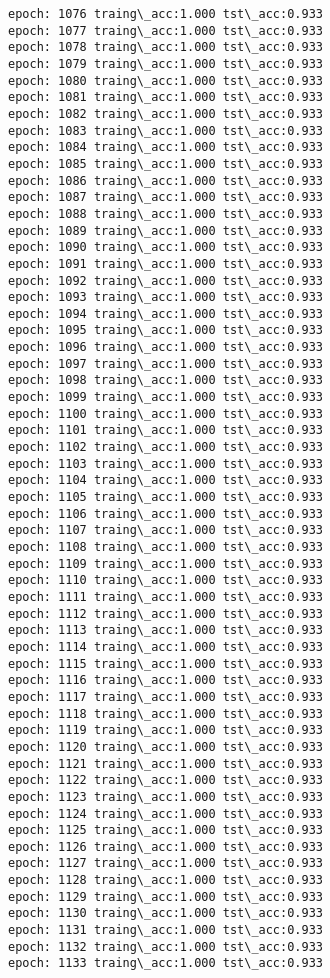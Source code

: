 \documentclass[11pt]{article}
\begin{document}
\begin{Verbatim}[commandchars=\\\{\}]
epoch: 1076 traing\_acc:1.000 tst\_acc:0.933
epoch: 1077 traing\_acc:1.000 tst\_acc:0.933
epoch: 1078 traing\_acc:1.000 tst\_acc:0.933
epoch: 1079 traing\_acc:1.000 tst\_acc:0.933
epoch: 1080 traing\_acc:1.000 tst\_acc:0.933
epoch: 1081 traing\_acc:1.000 tst\_acc:0.933
epoch: 1082 traing\_acc:1.000 tst\_acc:0.933
epoch: 1083 traing\_acc:1.000 tst\_acc:0.933
epoch: 1084 traing\_acc:1.000 tst\_acc:0.933
epoch: 1085 traing\_acc:1.000 tst\_acc:0.933
epoch: 1086 traing\_acc:1.000 tst\_acc:0.933
epoch: 1087 traing\_acc:1.000 tst\_acc:0.933
epoch: 1088 traing\_acc:1.000 tst\_acc:0.933
epoch: 1089 traing\_acc:1.000 tst\_acc:0.933
epoch: 1090 traing\_acc:1.000 tst\_acc:0.933
epoch: 1091 traing\_acc:1.000 tst\_acc:0.933
epoch: 1092 traing\_acc:1.000 tst\_acc:0.933
epoch: 1093 traing\_acc:1.000 tst\_acc:0.933
epoch: 1094 traing\_acc:1.000 tst\_acc:0.933
epoch: 1095 traing\_acc:1.000 tst\_acc:0.933
epoch: 1096 traing\_acc:1.000 tst\_acc:0.933
epoch: 1097 traing\_acc:1.000 tst\_acc:0.933
epoch: 1098 traing\_acc:1.000 tst\_acc:0.933
epoch: 1099 traing\_acc:1.000 tst\_acc:0.933
epoch: 1100 traing\_acc:1.000 tst\_acc:0.933
epoch: 1101 traing\_acc:1.000 tst\_acc:0.933
epoch: 1102 traing\_acc:1.000 tst\_acc:0.933
epoch: 1103 traing\_acc:1.000 tst\_acc:0.933
epoch: 1104 traing\_acc:1.000 tst\_acc:0.933
epoch: 1105 traing\_acc:1.000 tst\_acc:0.933
epoch: 1106 traing\_acc:1.000 tst\_acc:0.933
epoch: 1107 traing\_acc:1.000 tst\_acc:0.933
epoch: 1108 traing\_acc:1.000 tst\_acc:0.933
epoch: 1109 traing\_acc:1.000 tst\_acc:0.933
epoch: 1110 traing\_acc:1.000 tst\_acc:0.933
epoch: 1111 traing\_acc:1.000 tst\_acc:0.933
epoch: 1112 traing\_acc:1.000 tst\_acc:0.933
epoch: 1113 traing\_acc:1.000 tst\_acc:0.933
epoch: 1114 traing\_acc:1.000 tst\_acc:0.933
epoch: 1115 traing\_acc:1.000 tst\_acc:0.933
epoch: 1116 traing\_acc:1.000 tst\_acc:0.933
epoch: 1117 traing\_acc:1.000 tst\_acc:0.933
epoch: 1118 traing\_acc:1.000 tst\_acc:0.933
epoch: 1119 traing\_acc:1.000 tst\_acc:0.933
epoch: 1120 traing\_acc:1.000 tst\_acc:0.933
epoch: 1121 traing\_acc:1.000 tst\_acc:0.933
epoch: 1122 traing\_acc:1.000 tst\_acc:0.933
epoch: 1123 traing\_acc:1.000 tst\_acc:0.933
epoch: 1124 traing\_acc:1.000 tst\_acc:0.933
epoch: 1125 traing\_acc:1.000 tst\_acc:0.933
epoch: 1126 traing\_acc:1.000 tst\_acc:0.933
epoch: 1127 traing\_acc:1.000 tst\_acc:0.933
epoch: 1128 traing\_acc:1.000 tst\_acc:0.933
epoch: 1129 traing\_acc:1.000 tst\_acc:0.933
epoch: 1130 traing\_acc:1.000 tst\_acc:0.933
epoch: 1131 traing\_acc:1.000 tst\_acc:0.933
epoch: 1132 traing\_acc:1.000 tst\_acc:0.933
epoch: 1133 traing\_acc:1.000 tst\_acc:0.933

\end{Verbatim}
\end{document}
